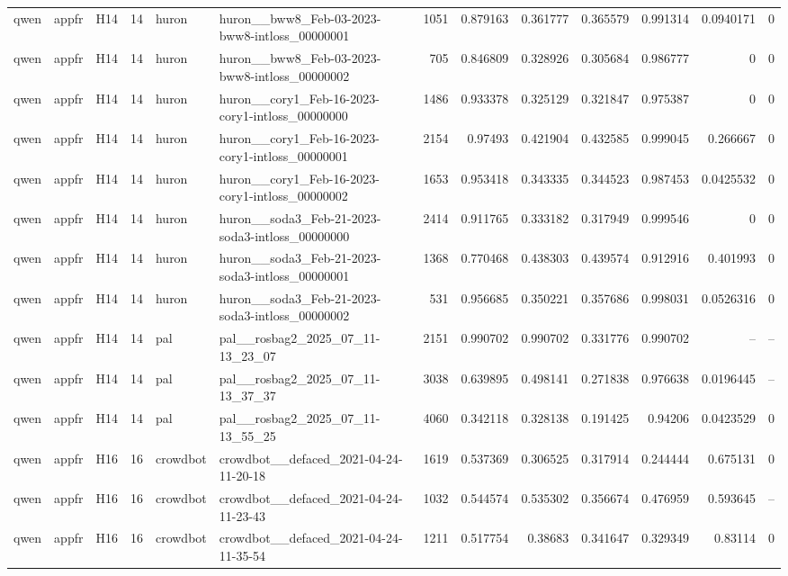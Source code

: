 \begin{longtable}{lllrllrrrrrrr}
qwen & appfr & H14 & 14 & huron & huron\_\_bww8\_Feb-03-2023-bww8-intloss\_00000001 & 1051 & 0.879163 & 0.361777 & 0.365579 & 0.991314 & 0.0940171 & 0 \\
qwen & appfr & H14 & 14 & huron & huron\_\_bww8\_Feb-03-2023-bww8-intloss\_00000002 & 705 & 0.846809 & 0.328926 & 0.305684 & 0.986777 & 0 & 0 \\
qwen & appfr & H14 & 14 & huron & huron\_\_cory1\_Feb-16-2023-cory1-intloss\_00000000 & 1486 & 0.933378 & 0.325129 & 0.321847 & 0.975387 & 0 & 0 \\
qwen & appfr & H14 & 14 & huron & huron\_\_cory1\_Feb-16-2023-cory1-intloss\_00000001 & 2154 & 0.97493 & 0.421904 & 0.432585 & 0.999045 & 0.266667 & 0 \\
qwen & appfr & H14 & 14 & huron & huron\_\_cory1\_Feb-16-2023-cory1-intloss\_00000002 & 1653 & 0.953418 & 0.343335 & 0.344523 & 0.987453 & 0.0425532 & 0 \\
qwen & appfr & H14 & 14 & huron & huron\_\_soda3\_Feb-21-2023-soda3-intloss\_00000000 & 2414 & 0.911765 & 0.333182 & 0.317949 & 0.999546 & 0 & 0 \\
qwen & appfr & H14 & 14 & huron & huron\_\_soda3\_Feb-21-2023-soda3-intloss\_00000001 & 1368 & 0.770468 & 0.438303 & 0.439574 & 0.912916 & 0.401993 & 0 \\
qwen & appfr & H14 & 14 & huron & huron\_\_soda3\_Feb-21-2023-soda3-intloss\_00000002 & 531 & 0.956685 & 0.350221 & 0.357686 & 0.998031 & 0.0526316 & 0 \\
qwen & appfr & H14 & 14 & pal & pal\_\_rosbag2\_2025\_07\_11-13\_23\_07 & 2151 & 0.990702 & 0.990702 & 0.331776 & 0.990702 & -- & -- \\
qwen & appfr & H14 & 14 & pal & pal\_\_rosbag2\_2025\_07\_11-13\_37\_37 & 3038 & 0.639895 & 0.498141 & 0.271838 & 0.976638 & 0.0196445 & -- \\
qwen & appfr & H14 & 14 & pal & pal\_\_rosbag2\_2025\_07\_11-13\_55\_25 & 4060 & 0.342118 & 0.328138 & 0.191425 & 0.94206 & 0.0423529 & 0 \\
qwen & appfr & H16 & 16 & crowdbot & crowdbot\_\_defaced\_2021-04-24-11-20-18 & 1619 & 0.537369 & 0.306525 & 0.317914 & 0.244444 & 0.675131 & 0 \\
qwen & appfr & H16 & 16 & crowdbot & crowdbot\_\_defaced\_2021-04-24-11-23-43 & 1032 & 0.544574 & 0.535302 & 0.356674 & 0.476959 & 0.593645 & -- \\
qwen & appfr & H16 & 16 & crowdbot & crowdbot\_\_defaced\_2021-04-24-11-35-54 & 1211 & 0.517754 & 0.38683 & 0.341647 & 0.329349 & 0.83114 & 0 \\

\end{longtable}
